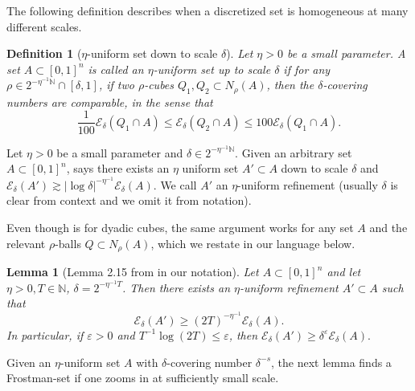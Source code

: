 \documentclass[letterpaper, reqno,11pt]{article}
\numberwithin{equation}{section}
\newcommand{\cP}{A}
\newcommand{\cE}{\mathcal{E}}
\newcommand{\eps}{\varepsilon}
\numberwithin{thm}{section}
\newtheorem{defn}[thm]{Definition}
\newtheorem{lem}[thm]{Lemma}
\theoremstyle{remark}
\begin{document}
The following definition describes when a discretized set is homogeneous at many different scales.


\begin{defn}[$\eta$-uniform set down to scale $\delta$]
     Let $\eta>0$ be a small parameter. A set $A\subset[0,1]^n$ is called an $\eta$-uniform set up to  scale $\delta$ if for any $\rho\in 2^{-\eta^{-1}\mathbb{N}}\cap [\delta,1]$, if two $\rho$-cubes $Q_1, Q_2\subset N_{\rho}(A)$, then the $\delta$-covering numbers are comparable, in the sense that 
     \[
     \frac{1}{100}\cE_{\delta}(Q_1\cap A) \leq \cE_{\delta}(Q_2\cap A)  \leq 100 \cE_{\delta}(Q_1\cap A) . 
     \]
\end{defn}

Let $\eta>0$ be a small parameter and $\delta \in  2^{-\eta^{-1}\mathbb{N}}$. Given an arbitrary set $ A \subset[0,1]^n$, \cite[Lemma 2.15]{OrponenShmerkin}  says there exists an $\eta$ uniform set  $A'\subset A$ down to scale $\delta$ and $\cE_{\delta}(A') \gtrsim |\log \delta|^{-\eta^{-1}} \cE_{\delta}(A)$. We call $A'$ an $\eta$-uniform refinement (usually $\delta$ is clear from context and we omit it from notation). 

Even though \cite[Lemma 2.15]{OrponenShmerkin} is for dyadic cubes, the same argument works for any set $A$ and the relevant $\rho$-balls $Q\subset N_{\rho}(A)$, which we restate  in our language below.

\begin{lem}[Lemma 2.15 from \cite{OrponenShmerkin} in our notation] \label{lem: uniform}
    Let $A\subset [0,1]^n$ and let $\eta>0, T\in \mathbb{N}$, $\delta= 2^{-\eta^{-1}T}$.  Then there exists an $\eta$-uniform refinement $\cP'\subset \cP$ such that 
    \[
    \cE_{\delta}(\cP')\geq (2T)^{-\eta^{-1}} \cE_{\delta}(\cP).
    \]
    In particular, if $\eps>0$ and $ T^{-1} \log(2T) \leq\eps$, then $ \cE_{\delta}(\cP')\geq \delta^{\eps} \cE_{\delta}(\cP). $
\end{lem}

Given an $\eta$-uniform set $\cP$ with $\delta$-covering number $\delta^{-s}$, the next lemma finds a Frostman-set if one zooms in at sufficiently small scale. 
\end{document}
